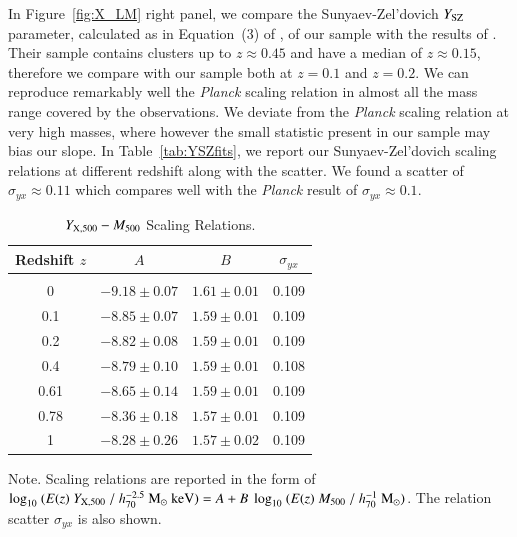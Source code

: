 \documentclass[traditabstract]{aa}
\newcommand{\rmn}{\mathrm}
\begin{document}
In Figure~\ref{fig:X_LM} right panel, we compare the Sunyaev-Zel'dovich $Y_{\rm{SZ}}$ parameter, calculated as in Equation~(3) of \cite{2011arXiv1109.3709B}, of our sample with the results of \cite{2011A&A...536A..11P}. Their sample contains clusters up to $z \approx 0.45$ and have a median of $z \approx 0.15$, therefore we compare with our sample both at $z=0.1$ and $z=0.2$. We can reproduce remarkably well the \emph{Planck} scaling relation in almost all the mass range covered by the observations. We deviate from the \emph{Planck} scaling relation at very high masses, where however the small statistic present in our sample may bias our slope. In Table~\ref{tab:YSZfits}, we report our Sunyaev-Zel'dovich scaling relations at different redshift along with the scatter. We found a scatter of $\sigma_{yx} \approx 0.11$ which compares well with the \emph{Planck} result of $\sigma_{yx} \approx 0.1$.
 
\begin{table}[hbt!]
\begin{center}
\caption{$Y_{\rm{X}, 500}-M_{500}$ Scaling Relations.}
\medskip
\begin{tabular}{cccc}
\hline
\phantom{\Big|}
Redshift $z$ & $A$ & $B$ & $\sigma_{yx}$ \\
\hline\\[-0.5em]
 0      & $-9.18\pm0.07$ & $1.61\pm0.01$ & 0.109\\
 0.1   & $-8.85\pm0.07$ & $1.59\pm0.01$ & 0.109\\
 0.2   & $-8.82\pm0.08$ & $1.59\pm0.01$ & 0.109\\ 
 0.4   & $-8.79\pm0.10$ & $1.59\pm0.01$ & 0.108\\ 
 0.61 & $-8.65\pm0.14$ & $1.59\pm0.01$ & 0.109\\ 
 0.78 & $-8.36\pm0.18$ & $1.57\pm0.01$ & 0.109\\ 
 1      & $-8.28\pm0.26$ & $1.57\pm0.02$ & 0.109\\[0.5em]  
\hline
\end{tabular}
\label{tab:YXfits}
\end{center}
\footnotesize{Note. Scaling relations are reported in the form of $\log_{10}~(E(z)~Y_{\rm{X},500}~/~h_{70}^{-2.5}~\rmn{M_{\odot}}~\rmn{keV})=A+B~\log_{10}~(E(z)~M_{500}~/~h_{70}^{-1}~\rmn{M_{\odot}})$. The relation scatter $\sigma_{yx}$ is also shown.}
\end{table}
\end{document}
